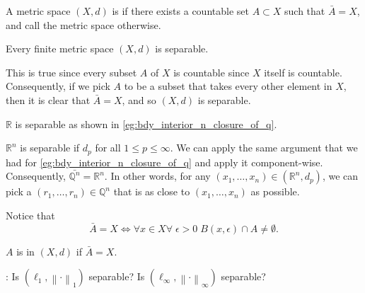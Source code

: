 \documentclass[notoc,notitlepage]{tufte-book}
\newcommand{\norm}[1]{\left\| #1 \right\|}
\begin{document}
\begin{defn}[Separable]\label{defn:separable}
  A metric space $(X, d)$ is  if there exists a countable set $A \subset X$ such that $\bar{A} = X$, and call the metric space  otherwise.
\end{defn}

\begin{eg}
  Every finite metric space $(X, d)$ is separable.

  This is true since every subset $A$ of $X$ is countable since $X$ itself is countable. Consequently, if we pick $A$ to be a subset that takes every other element in $X$, then it is clear that $\bar{A} = X$, and so $(X, d)$ is separable.
\end{eg}

\begin{eg}
  $\mathbb{R}$ is separable as shown in \cref{eg:bdy_interior_n_closure_of_q}.
\end{eg}

\begin{eg}
  $\mathbb{R}^n$ is separable if $d_p$ for all $1 \leq p \leq \infty$. We can apply the same argument that we had for \cref{eg:bdy_interior_n_closure_of_q} and apply it component-wise. Consequently, $\bar{\mathbb{Q}^n} = \mathbb{R}^n$. In other words, for any $(x_1, \ldots, x_n) \in (\mathbb{R}^n, d_p)$, we can pick a $(r_1, \ldots, r_n) \in \mathbb{Q}^n$ that is as close to $(x_1, \ldots, x_n)$ as possible.
\end{eg}

\begin{remark}
  Notice that
  \begin{equation*}
    \bar{A} = X \iff \forall x \in X \forall \; \epsilon > 0 \; B(x, \epsilon) \cap A \neq \emptyset.
  \end{equation*}
\end{remark}

\begin{defn}[Dense]\label{defn:dense}
  $A$ is  in $(X, d)$ if $\bar{A} = X$.
\end{defn}

: Is $(\ell_1, \norm\cdot_1)$ separable? Is $(\ell_\infty, \norm\cdot_\infty)$ separable?
\end{document}
